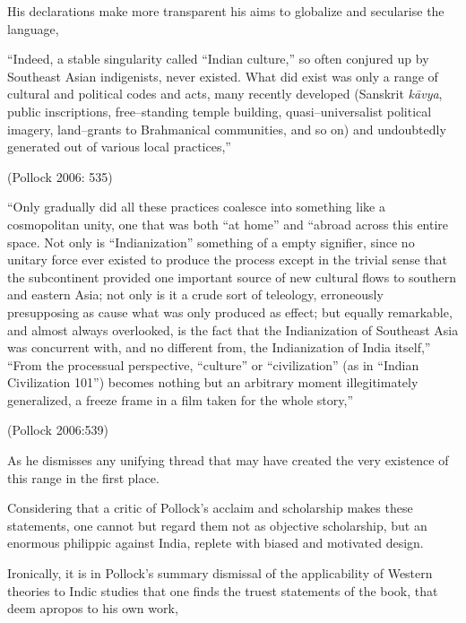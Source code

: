 His declarations make more transparent his aims to globalize and secularise the language,

\begin{myquote}
“Indeed, a stable singularity called “Indian culture,” so often conjured up by Southeast Asian indigenists, never existed. What did exist was only a range of cultural and political codes and acts, many recently developed (Sanskrit \textit{kāvya}, public inscriptions, free–standing temple building, quasi–universalist political imagery, land–grants to Brahmanical communities, and so on) and undoubtedly generated out of various local practices,”
\end{myquote}

\hfill (Pollock 2006: 535)

\begin{myquote}
“Only gradually did all these practices coalesce into something like a cosmopolitan unity, one that was both “at home” and “abroad across this entire space. Not only is “Indianization” something of a empty signifier, since no unitary force ever existed to produce the process except in the trivial sense that the subcontinent provided one important source of new cultural flows to southern and eastern Asia; not only is it a crude sort of teleology, erroneously presupposing as cause what was only produced as effect; but equally remarkable, and almost always overlooked, is the fact that the Indianization of Southeast Asia was concurrent with, and no different from, the Indianization of India itself,” “From the processual perspective, “culture” or “civilization” (as in “Indian Civilization 101”) becomes nothing but an arbitrary moment illegitimately generalized, a freeze frame in a film taken for the whole story,”
\end{myquote}

\hfill (Pollock 2006:539) 

As he dismisses any unifying thread that may have created the very existence of this range in the first place.

Considering that a critic of Pollock’s acclaim and scholarship makes these statements, one cannot but regard them not as objective scholarship, but an enormous philippic against India, replete with biased and motivated design.

Ironically, it is in Pollock’s summary dismissal of the applicability of Western theories to Indic studies that one finds the truest statements of the book, that deem apropos to his own work,

